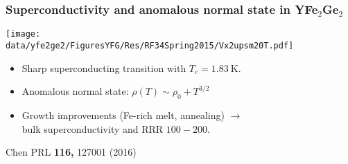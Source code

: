 \begin{frame}[label=YFGRes211]
\frametitle{Superconductivity and anomalous normal state in YFe$_2$Ge$_2$}
\centerline{\texttt{[image: \\data/yfe2ge2/FiguresYFG/Res/RF34Spring2015/Vx2upsm20T.pdf]}}


\begin{itemize}
\item
Sharp superconducting transition with $T_c =
1.83~\mathrm{K}$.

\item
 Anomalous normal state: $\rho(T) \sim \rho_0 + T^{3/2}$ %

\item<2->
Growth improvements (Fe-rich melt, annealing) $\rightarrow$ \\ bulk superconductivity and RRR $100-200$.
\end{itemize}


\vspace*{\fill}
\centerline{\makebox[\linewidth]{\rule{0.85\textwidth}{0.4pt}}}
\centerline{\scriptsize Chen PRL {\bf 116,} 127001 (2016)}
\end{frame}




